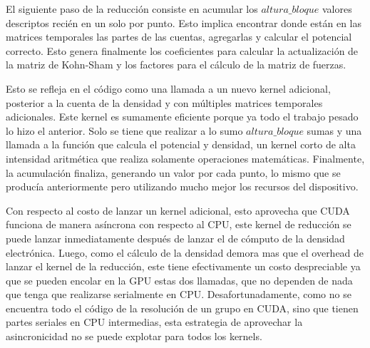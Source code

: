 El siguiente paso de la reducci\'on consiste en acumular los $altura\_bloque$ valores descriptos
reci\'en en un solo por punto. Esto implica encontrar donde est\'an en las matrices temporales las
partes de las cuentas, agregarlas y calcular el potencial correcto. Esto genera finalmente los
coeficientes para calcular la actualizaci\'on de la matriz de Kohn-Sham y los factores para el
c\'alculo de la matriz de fuerzas.

Esto se refleja en el c\'odigo como una llamada a un nuevo kernel adicional, posterior a la
cuenta de la densidad y con m\'ultiples matrices temporales adicionales. Este kernel es sumamente
eficiente porque ya todo el trabajo pesado lo hizo el anterior. Solo se tiene que realizar
a lo sumo $altura\_bloque$ sumas y una llamada a la funci\'on que calcula el potencial y densidad,
un kernel corto de alta intensidad aritm\'etica que realiza solamente operaciones matem\'aticas.
Finalmente, la acumulaci\'on finaliza, generando un valor por cada punto, lo mismo que se produc\'ia
anteriormente pero utilizando mucho mejor los recursos del dispositivo.

Con respecto al costo de lanzar un kernel adicional, esto aprovecha que CUDA funciona de manera as\'incrona
con respecto al CPU, este kernel de reducci\'on se puede lanzar inmediatamente despu\'es de lanzar el
de c\'omputo de la densidad electr\'onica. Luego, como el c\'alculo de la densidad demora mas que
el overhead de lanzar el kernel de la reducci\'on, este tiene efectivamente un costo despreciable
ya que se pueden encolar en la GPU estas dos llamadas, que no dependen de nada que tenga que realizarse serialmente en CPU.
Desafortunadamente, como no se encuentra todo el c\'odigo de la resoluci\'on de un grupo en CUDA,
sino que tienen partes seriales en CPU intermedias, esta estrategia de aprovechar la asincronicidad
no se puede explotar para todos los kernels.


%



